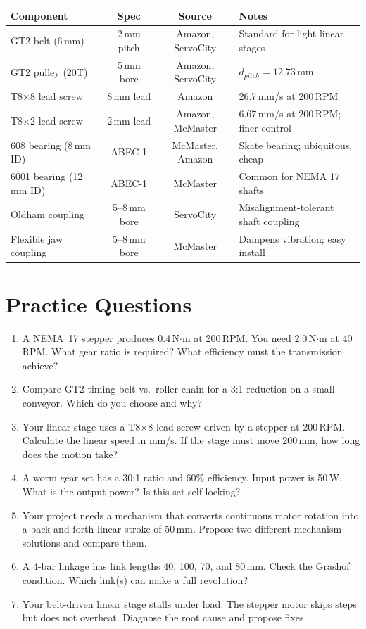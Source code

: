 \documentclass[11pt,letterpaper,twoside,openany]{book}
\begin{document}
\begin{quickrefbox}
\begin{table}[H]\centering\small
\begin{tabularx}{\textwidth}{l c c X}
\toprule
\textbf{Component} & \textbf{Spec} & \textbf{Source} & \textbf{Notes} \\
\midrule
GT2 belt (6\,mm) & 2\,mm pitch & Amazon, ServoCity & Standard for light linear stages \\
GT2 pulley (20T) & 5\,mm bore & Amazon, ServoCity & $d_{pitch} = 12.73$\,mm \\
T8$\times$8 lead screw & 8\,mm lead & Amazon & 26.7\,mm/s at 200\,RPM \\
T8$\times$2 lead screw & 2\,mm lead & Amazon, McMaster & 6.67\,mm/s at 200\,RPM; finer control \\
608 bearing (8\,mm ID) & ABEC-1 & McMaster, Amazon & Skate bearing; ubiquitous, cheap \\
6001 bearing (12\,mm ID) & ABEC-1 & McMaster & Common for NEMA 17 shafts \\
Oldham coupling & 5--8\,mm bore & ServoCity & Misalignment-tolerant shaft coupling \\
Flexible jaw coupling & 5--8\,mm bore & McMaster & Dampens vibration; easy install \\
\bottomrule
\end{tabularx}
\end{table}
\end{quickrefbox}

\section{Practice Questions}
\begin{enumerate}[leftmargin=1.5em]
\item A NEMA~17 stepper produces 0.4\,N$\cdot$m at 200\,RPM. You need 2.0\,N$\cdot$m at 40\,RPM. What gear ratio is required? What efficiency must the transmission achieve?
\item Compare GT2 timing belt vs.\ roller chain for a 3:1 reduction on a small conveyor. Which do you choose and why?
\item Your linear stage uses a T8$\times$8 lead screw driven by a stepper at 200\,RPM. Calculate the linear speed in mm/s. If the stage must move 200\,mm, how long does the motion take?
\item A worm gear set has a 30:1 ratio and 60\% efficiency. Input power is 50\,W. What is the output power? Is this set self-locking?
\item Your project needs a mechanism that converts continuous motor rotation into a back-and-forth linear stroke of 50\,mm. Propose two different mechanism solutions and compare them.
\item A 4-bar linkage has link lengths 40, 100, 70, and 80\,mm. Check the Grashof condition. Which link(s) can make a full revolution?
\item Your belt-driven linear stage stalls under load. The stepper motor skips steps but does not overheat. Diagnose the root cause and propose fixes.
\end{enumerate}
\end{document}
